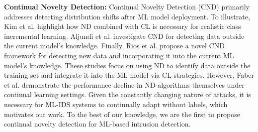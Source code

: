 \textbf{Continual Novelty Detection:} %
Continual Novelty Detection (CND) primarily addresses detecting distribution shifts after ML model deployment. To illustrate, Kim et al. \cite{kim2023openworld} highlight how ND combined with CL is necessary for realistic class incremental learning. 
Aljundi et al. \cite{aljundi2022continual} investigate CND for detecting data outside the current model's knowledge. Finally, Rios et al. \cite{rios2022incdfm} propose a novel CND framework for detecting new data and incorporating it into the current ML model's knowledge. 
These studies focus on using ND to identify data outside the training set and integrate it into the ML model via CL strategies. However, Faber et al.\cite{Faber_2024} demonstrate the performance decline in ND-algorithms themselves under continual learning settings. 
Given the constantly changing nature of attacks, it is necessary for ML-IDS systems to continually adapt without labels, which motivates our work. %
To the best of our knowledge, we are the first to propose continual novelty detection for ML-based intrusion detection.  





